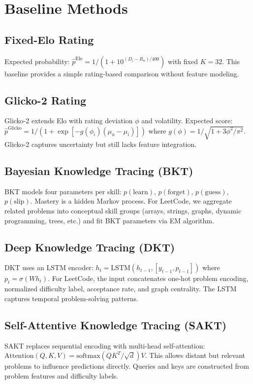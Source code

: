 \documentclass[conference]{IEEEtran}
\begin{document}
\section{Baseline Methods}

\subsection{Fixed-Elo Rating}
Expected probability: $\hat{p}^{\text{Elo}} = 1/(1+10^{(D_i-R_u)/400})$ with fixed $K=32$. This baseline provides a simple rating-based comparison without feature modeling.

\subsection{Glicko-2 Rating}
Glicko-2 extends Elo with rating deviation $\phi$ and volatility. Expected score: $\hat{p}^{\text{Glicko}} = 1/(1 + \exp[-g(\phi_i)(\mu_u - \mu_i)])$ where $g(\phi) = 1/\sqrt{1 + 3\phi^2/\pi^2}$. Glicko-2 captures uncertainty but still lacks feature integration.

\subsection{Bayesian Knowledge Tracing (BKT)}
BKT models four parameters per skill: $p(\text{learn})$, $p(\text{forget})$, $p(\text{guess})$, $p(\text{slip})$. Mastery is a hidden Markov process. For LeetCode, we aggregate related problems into conceptual skill groups (arrays, strings, graphs, dynamic programming, trees, etc.) and fit BKT parameters via EM algorithm.

\subsection{Deep Knowledge Tracing (DKT)}
DKT uses an LSTM encoder: $h_t = \text{LSTM}(h_{t-1}, [y_{t-1}, p_{t-1}])$ where $p_t = \sigma(W h_t)$. For LeetCode, the input concatenates one-hot problem encoding, normalized difficulty label, acceptance rate, and graph centrality. The LSTM captures temporal problem-solving patterns.

\subsection{Self-Attentive Knowledge Tracing (SAKT)}
SAKT replaces sequential encoding with multi-head self-attention: $\text{Attention}(Q,K,V) = \text{softmax}(QK^T/\sqrt{d})V$. This allows distant but relevant problems to influence predictions directly. Queries and keys are constructed from problem features and difficulty labels.
\end{document}
